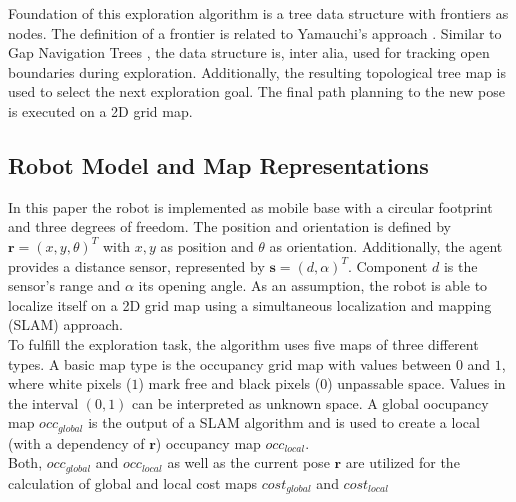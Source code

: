 \documentclass[twocolumn]{svjour3}[2016]
\begin{document}
Foundation of this exploration algorithm is a tree data structure with frontiers as nodes. The definition of a frontier is related to Yamauchi's approach \cite{brian_yamauchi_frontier-based_2007}. Similar to Gap Navigation Trees \cite{benjamin_tovar_optimal_2003}, the data structure is, inter alia, used for tracking open boundaries during exploration. Additionally, the resulting topological tree map is used to select the next exploration goal. The final path planning to the new pose is executed on a 2D grid map.


\subsection{Robot Model and Map Representations}
In this paper the robot is implemented as mobile base with a circular footprint and three degrees of freedom. The position and orientation is defined by $\textbf{r} = (x, y, \theta)^{T}$ with $x, y$ as position and $\theta$ as orientation. Additionally, the agent provides a distance sensor, represented by $\textbf{s} = (d, \alpha)^{T}$. Component $d$ is the sensor's range and $\alpha$ its opening angle. As an assumption, the robot is able to localize itself on a 2D grid map using a simultaneous localization and mapping (SLAM) approach.\\
To fulfill the exploration task, the algorithm uses five maps of three different types. A basic map type is the occupancy grid map with values between $0$ and $1$, where white pixels ($1$) mark free and black pixels ($0$) unpassable space. Values in the interval $(0,1)$ can be interpreted as unknown space. A global oocupancy map $occ_{global}$ is the output of a SLAM algorithm and is used to create a local (with a dependency of $\textbf{r}$) occupancy map $occ_{local}$.\\
Both, $occ_{global}$ and $occ_{local}$ as well as the current pose $\textbf{r}$ are utilized for the calculation of global and local cost maps $cost_{global}$ and $cost_{local}$
\end{document}

